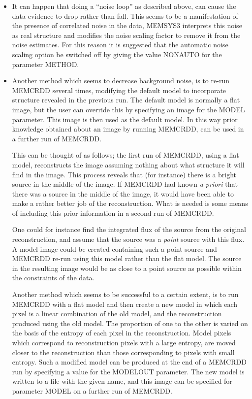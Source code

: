 \begin {itemize}
\item It can happen that doing a ``noise loop'' as described above, can cause 
the data evidence to drop rather than fall. This seems to be a manifestation of 
the presence of correlated noise in the data, MEMSYS3 interprets this noise as 
real structure and modifies the noise scaling factor to remove it from the 
noise estimates. For this reason it is suggested that the automatic noise 
scaling option be switched off by giving the value NONAUTO for the parameter 
METHOD.

\item Another method which seems to decrease background noise, is to re-run 
MEMCRDD several times, modifying the default model to incorporate structure
revealed in the previous run. The default model is normally a flat image, but
the user can override this by specifying an image for the MODEL parameter. This
image is then used as the default model.  In this way prior knowledge obtained
about an image by running MEMCRDD, can be used in a further run of MEMCRDD. 

This can be thought of as follows; the first run of MEMCRDD, using a flat
model, reconstructs the image assuming nothing about what structure it will
find in the image. This process reveals that (for instance) there is a bright
source in the middle of the image. If MEMCRDD had known {\em a priori} that
there was a source in the middle of the image, it would have been able to make
a rather better job of the reconstruction. What is needed is some means of
including this prior information in a second run of MEMCRDD. 

One could for instance find the integrated flux of the source from the original
reconstruction, and assume that the source was a {\em point} source with this
flux. A model image could be created containing such a point source and MEMCRDD
re-run using this model rather than the flat model. The source in the resulting
image would be as close to a point source as possible within the constraints 
of the data. 

Another method which seems to be successful to a certain extent, is to run
MEMCRDD with a flat model and then create a new model in which each pixel is a
linear combination of the old model, and the reconstruction produced using the
old model. The proportion of one to the other is varied on the basis of the
entropy of each pixel in the reconstruction. Model pixels which correspond to
reconstruction pixels with a large entropy, are moved closer to the
reconstruction than those corresponding to pixels with small entropy. Such a
modified model can be produced at the end of a MEMCRDD run by specifying a
value for the MODELOUT parameter. The new model is written to a file with the
given name, and this image can be specified for parameter MODEL on a further
run of MEMCRDD. 


\end{itemize}
